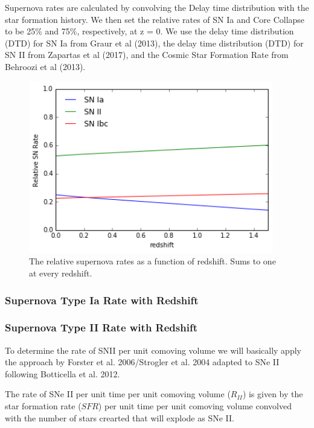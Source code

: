 \documentclass[12pt, onecolumn]{emulateapj}
\begin{document}
Supernova rates are calculated by convolving the Delay time distribution with the star formation history. We then set the relative rates of SN Ia and Core Collapse to be 25\% and 75\%, respectively, at z = 0. We use the delay time distribution (DTD) for SN Ia from Graur et al (2013), the delay time distribution (DTD) for SN II from Zapartas et al (2017), and the Cosmic Star Formation Rate from Behroozi et al (2013).

\begin{figure}
	\begin{center}
		\includegraphics[width=0.95\textwidth]{relative_supernova_rate.png}
		\caption{The relative supernova rates as a function of redshift. Sums to one at every redshift.}
		\label{fig:realtive_supernova_rates}
	\end{center}
\end{figure}

\subsubsection{Supernova Type Ia Rate with Redshift}
\label{sec:TypeIaRate}

\subsubsection{Supernova Type II Rate with Redshift}
\label{sec:TypeIIRate}

To determine the rate of SNII per unit comoving volume we will basically apply the approach by Forster et al. 2006/Strogler et al. 2004 adapted to SNe II following Botticella et al. 2012.

The rate of SNe II per unit time per unit comoving volume ($R_{II}$) is given by the star formation rate ($SFR$) per unit time per unit comoving volume convolved with the number of stars crearted that will explode as SNe II.
\end{document}
